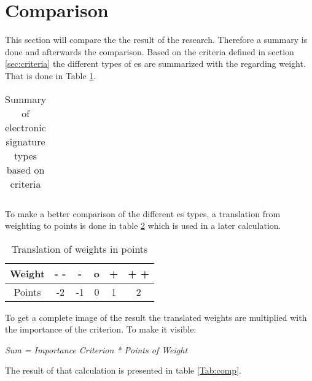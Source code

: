 \section{Comparison} \label{sec:compT}
This section will compare the the result of the research. Therefore a summary is done and afterwards the comparison.
Based on the criteria defined in section \ref{sec:criteria} the different types of \gls{es} are summarized with the regarding weight. That is done in Table \ref{tab:summary}.

\begin{table}[h]
	\begin{tabular}{|c|c|c|c|c|} \hline
	\end{tabular}
	\centering
	\caption{Summary of electronic signature types based on criteria}
	\label{tab:summary}
\end{table}

To make a better comparison of the different \gls{es} types, a translation from weighting to points is done in table \ref{Tab:Translation} which is used in a later calculation.

\begin{table}[h]
	\begin{tabular}{|c|c|c|c|c|c|} \hline
		Weight & - - & - & o & + & + + \\ \hline
		Points & -2 & -1 & 0 & 1 & 2 \\ \hline
	\end{tabular}
	\centering
	\caption{Translation of weights in points}
	\label{Tab:Translation}
\end{table}

To get a complete image of the result the translated weights are multiplied with the importance of the criterion. To make it visible:
\begin{center}
	\textit{Sum = Importance Criterion * Points of Weight}
\end{center}
The result of that calculation is presented in table \ref{Tab:comp}.

